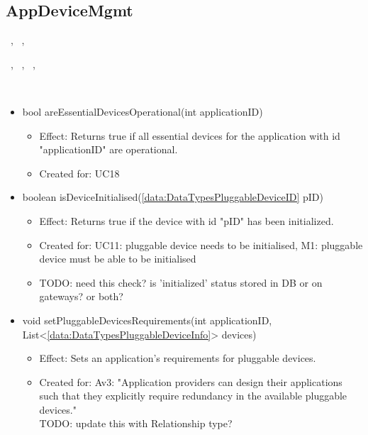   \subsection{AppDeviceMgmt}\label{int:GatewayGatewayDeviceManagerAppDeviceMgmt}
    \begin{description}
      \item[Provided by:] \iconcomponent{}~, \iconcomponent{}~, \iconcomponent{}~
      \item[Required by:] \iconcomponent{}~, \iconcomponent{}~, \iconcomponent{}~, \iconcomponent{}~
      \item[Operations:] ~
    \begin{itemize}[noitemsep,nolistsep,leftmargin=-.25cm]
      \item \textsf{bool areEssentialDevicesOperational(int applicationID)}
        \begin{itemize}[noitemsep,nolistsep]
           \item Effect: Returns true if all essential devices for the application with id "applicationID" are operational.
\item Created for: UC18
        \end{itemize}
      \item \textsf{boolean isDeviceInitialised(\ref{data:DataTypesPluggableDeviceID} pID)}
        \begin{itemize}[noitemsep,nolistsep]
           \item Effect: Returns true if the device with id "pID" has been initialized.
\item Created for: UC11: pluggable device needs to be initialised, M1: pluggable device must be able to be initialised
\item TODO: need this check? is 'initialized' status stored in DB or on gateways? or both?
        \end{itemize}
      \item \textsf{void setPluggableDevicesRequirements(int applicationID, List\textless{}\ref{data:DataTypesPluggableDeviceInfo}\textgreater{} devices)}
        \begin{itemize}[noitemsep,nolistsep]
           \item Effect: Sets an application's requirements for pluggable devices.
\item Created for: Av3: "Application providers can design their applications such that they explicitly require redundancy in the available pluggable devices." \\
TODO: update this with Relationship type?
        \end{itemize}
    \end{itemize}
    \end{description}

